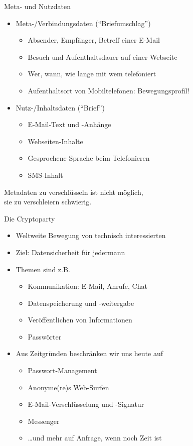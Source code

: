\begin{frame}{Meta- und Nutzdaten}
  \begin{itemize}
    \item Meta-/Verbindungsdaten (``Briefumschlag'')
    \begin{itemize}
      \item Absender, Empfänger, Betreff einer E-Mail
      \item Besuch und Aufenthaltsdauer auf einer Webseite
      \item Wer, wann, wie lange mit wem telefoniert
      \item Aufenthaltsort von Mobiltelefonen: Bewegungsprofil!
    \end{itemize}
    \item Nutz-/Inhaltsdaten (``Brief'')
    \begin{itemize}
      \item E-Mail-Text und -Anhänge
      \item Webseiten-Inhalte
      \item Gesprochene Sprache beim Telefonieren
      \item SMS-Inhalt
    \end{itemize}
  \end{itemize}

Metadaten zu verschlüsseln ist nicht möglich,\\ sie zu verschleiern schwierig.
\end{frame}

\begin{frame}{Die Cryptoparty}
  \begin{itemize}
    \item Weltweite Bewegung von technisch interessierten
    \item Ziel: Datensicherheit für jedermann
    \item Themen sind z.B.
    \begin{itemize}
      \item Kommunikation: E-Mail, Anrufe, Chat
      \item Datenspeicherung und -weitergabe
      \item Veröffentlichen von Informationen
      \item Passwörter
    \end{itemize}
    \item Aus Zeitgründen beschränken wir uns heute auf 
    \begin{itemize}
      \item Passwort-Management
      \item Anonyme(re)s Web-Surfen
      \item E-Mail-Verschlüsselung und -Signatur
      \item Messenger
      \item \ldots und mehr auf Anfrage, wenn noch Zeit ist
    \end{itemize}
  \end{itemize}
\end{frame}



\endinput
